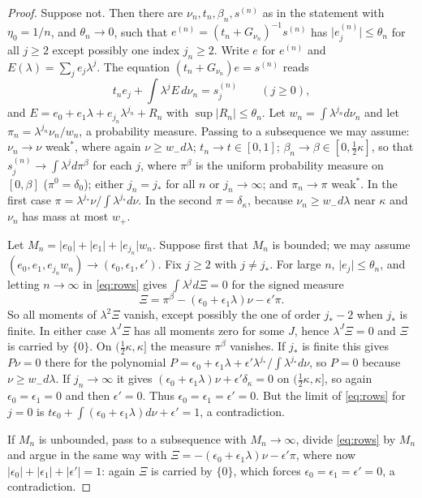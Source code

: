 \documentclass[11pt]{article}
\theoremstyle{definition}
\newcommand{\abs}[1]{\lvert #1\rvert}
\begin{document}
\begin{proof}
Suppose not. Then there are $\nu_n,t_n,\beta_n,s^{(n)}$ as in the statement with
$\eta_0=1/n$, and $\theta_n\to0$, such that $e^{(n)}=(t_n+G_{\nu_n})^{-1}s^{(n)}$ has
$\abs{e^{(n)}_j}\le\theta_n$ for all $j\ge2$ except possibly one index $j_n\ge2$. Write $e$
for $e^{(n)}$ and $E(\lambda)=\sum_je_j\lambda^j$. The equation $(t_n+G_{\nu_n})e=s^{(n)}$
reads
\begin{equation}\label{eq:rows}
t_ne_j+\int\lambda^jE\,d\nu_n=s^{(n)}_j\qquad(j\ge0),
\end{equation}
and $E=e_0+e_1\lambda+e_{j_n}\lambda^{j_n}+R_n$ with $\sup\abs{R_n}\le\theta_n$. Let
$w_n=\int\lambda^{j_n}d\nu_n$ and let $\pi_n=\lambda^{j_n}\nu_n/w_n$, a probability measure.
Passing to a subsequence we may assume: $\nu_n\to\nu$ weak$^*$, where again
$\nu\ge w_-d\lambda$; $t_n\to t\in[0,1]$; $\beta_n\to\beta\in[0,\frac12\kappa]$, so that
$s^{(n)}_j\to\int\lambda^jd\pi^\beta$ for each $j$, where $\pi^\beta$ is the uniform
probability measure on $[0,\beta]$ ($\pi^0=\delta_0$); either $j_n=j_*$ for all $n$ or
$j_n\to\infty$; and $\pi_n\to\pi$ weak$^*$. In the first case $\pi=\lambda^{j_*}\nu/\!\int
\lambda^{j_*}d\nu$. In the second $\pi=\delta_\kappa$, because $\nu_n\ge w_-d\lambda$ near
$\kappa$ and $\nu_n$ has mass at most $w_+$.

Let $M_n=\abs{e_0}+\abs{e_1}+\abs{e_{j_n}}w_n$. Suppose first that $M_n$ is bounded; we may
assume $(e_0,e_1,e_{j_n}w_n)\to(\epsilon_0,\epsilon_1,\epsilon')$. Fix $j\ge2$ with
$j\ne j_*$. For large $n$, $\abs{e_j}\le\theta_n$, and letting $n\to\infty$ in
\eqref{eq:rows} gives $\int\lambda^jd\Xi=0$ for the signed measure
\[
\Xi=\pi^\beta-(\epsilon_0+\epsilon_1\lambda)\nu-\epsilon'\pi .
\]
So all moments of $\lambda^2\Xi$ vanish, except possibly the one of order $j_*-2$ when $j_*$
is finite. In either case $\lambda^{J}\Xi$ has all moments zero for some $J$, hence
$\lambda^J\Xi=0$ and $\Xi$ is carried by $\{0\}$. On $(\frac12\kappa,\kappa]$ the measure
$\pi^\beta$ vanishes. If $j_*$ is finite this gives $P\nu=0$ there for the polynomial
$P=\epsilon_0+\epsilon_1\lambda+\epsilon'\lambda^{j_*}/\!\int\lambda^{j_*}d\nu$, so $P=0$
because $\nu\ge w_-d\lambda$. If $j_n\to\infty$ it gives
$(\epsilon_0+\epsilon_1\lambda)\nu+\epsilon'\delta_\kappa=0$ on $(\frac12\kappa,\kappa]$, so
again $\epsilon_0=\epsilon_1=0$ and then $\epsilon'=0$. Thus
$\epsilon_0=\epsilon_1=\epsilon'=0$. But the limit of \eqref{eq:rows} for $j=0$ is
$t\epsilon_0+\int(\epsilon_0+\epsilon_1\lambda)d\nu+\epsilon'=1$, a contradiction.

If $M_n$ is unbounded, pass to a subsequence with $M_n\to\infty$, divide \eqref{eq:rows} by
$M_n$ and argue in the same way with
$\Xi=-(\epsilon_0+\epsilon_1\lambda)\nu-\epsilon'\pi$, where now
$\abs{\epsilon_0}+\abs{\epsilon_1}+\abs{\epsilon'}=1$: again $\Xi$ is carried by $\{0\}$,
which forces $\epsilon_0=\epsilon_1=\epsilon'=0$, a contradiction.
\end{proof}
\end{document}

